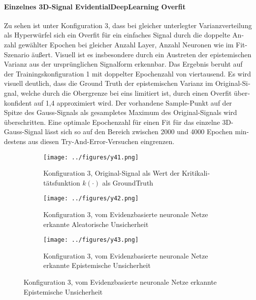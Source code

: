 \begin{otherlanguage}{ngerman}
\paragraph{Einzelnes 3D-Signal \gls{EvidentialDeepLearning} Overfit} Zu sehen ist unter Konfiguration 3, dass bei gleicher unterlegter Varianzverteilung als Hyperwürfel sich ein Overfit für ein einfaches Signal durch die doppelte Anzahl gewählter Epochen bei gleicher Anzahl Layer, Anzahl Neuronen wie im Fit-Szenario äußert. Visuell ist es insbesondere durch ein Austreten der epistemischen Varianz aus der ursprünglichen Signalform erkennbar. Das Ergebnis beruht auf der Trainingskonfiguration 1 mit doppelter Epochenzahl von viertausend. Es wird visuell deutlich, dass die Ground Truth der epistemischen Varianz im Original-Signal, welche durch die Obergrenze bei eins limitiert ist, durch einen Overfit überkonfident auf 1,4 approximiert wird. Der vorhandene Sample-Punkt auf der Spitze des Gauss-Signals als gesampletes Maximum des Original-Signals wird überschritten. Eine optimale Epochenzahl für einen Fit für das einzelne 3D-Gauss-Signal lässt sich so auf den Bereich zwischen 2000 und 4000 Epochen mindestens aus diesen Try-And-Error-Versuchen eingrenzen.



\begin{figure}[!ht]
  \centering

  \begin{subfigure}[t]{\textwidth}
    \centering
    \texttt{[image: ../figures/y41.png]}
    \caption{Konfiguration 3, Original-Signal als Wert der Kritikalitätsfunktion \(k(\cdot)\) als \gls{GroundTruth}}
    \label{fig:bild31}
  \end{subfigure}

  \vspace{0.5em}

  \begin{subfigure}[t]{\textwidth}
    \centering
    \texttt{[image: ../figures/y42.png]}
    \caption{Konfiguration 3, vom \gls{Evidenzbasierte neuronale Netze} erkannte \gls{Aleatorische Unsicherheit}}
    \label{fig:bild32}
  \end{subfigure}

  \vspace{0.5em}

  \begin{subfigure}[t]{\textwidth}
    \centering
    \texttt{[image: ../figures/y43.png]}
    \caption{Konfiguration 3, vom \gls{Evidenzbasierte neuronale Netze} erkannte \gls{Epistemische Unsicherheit}}
    \label{fig:bild33}
  \end{subfigure}


\end{figure}
\end{otherlanguage}
